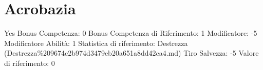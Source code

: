 \section{Acrobazia}\label{acrobazia}

\begin{description}
\tightlist
\item[Tags: ABI]
Yes Bonus Competenza: 0 Bonus Competenza di Riferimento: 1 Modificatore:
-5 Modificatore Abilità: 1 Statistica di riferimento: Destrezza
(Destrezza\%209674c2b974d3479eb20a651a8dd42ca4.md) Tiro Salvezza: -5
Valore di riferimento: 0
\end{description}
